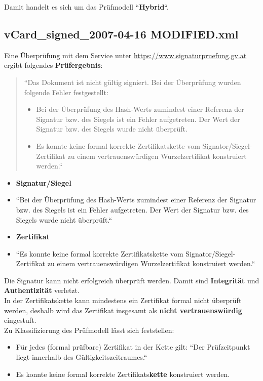 \noindent
Damit handelt es sich um das Prüfmodell ``\textbf{Hybrid}``.

\subsection*{vCard\_signed\_2007-04-16 MODIFIED.xml}

Eine Überprüfung mit dem Service unter \url{https://www.signaturpruefung.gv.at} ergibt folgendes \textbf{Prüfergebnis}:

\blockquote[]{
    ``Das Dokument ist nicht gültig signiert. Bei der Überprüfung wurden folgende Fehler festgestellt:
    \begin{itemize}
        \item  Bei der Überprüfung des Hash-Werts zumindest einer Referenz der Signatur bzw. des Siegels ist ein Fehler aufgetreten. Der Wert der Signatur bzw. des Siegels wurde nicht überprüft.
        \item  Es konnte keine formal korrekte Zertifikatskette vom Signator/Siegel-Zertifikat zu einem vertrauenswürdigen Wurzelzertifikat konstruiert werden.``
    \end{itemize}
}

\begin{itemize}
    \itemsep0.5em
    \item \textbf{Signatur/Siegel}
    \item[] ``Bei der Überprüfung des Hash-Werts zumindest einer Referenz der Signatur bzw. des Siegels ist ein Fehler aufgetreten. Der Wert der Signatur bzw. des Siegels wurde nicht überprüft.``
    \item \textbf{Zertifikat}
    \item[] ``Es konnte keine formal korrekte Zertifikatskette vom Signator/Siegel-Zertifikat zu einem vertrauenswürdigen Wurzelzertifikat konstruiert werden.``
\end{itemize}

\noindent
Die Signatur kann nicht erfolgreich überprüft werden.
Damit sind \textbf{Integrität} und \textbf{Authentizität} verletzt.\\

\noindent
In der Zertifikatskette kann mindestens ein Zertifikat formal nicht überprüft werden, deshalb wird das Zertifikat insgesamt als \textbf{nicht vertrauenswürdig} eingestuft.\\

\noindent
Zu Klassifizierung des Prüfmodell lässt sich feststellen:

\begin{itemize}
    \itemsep0.5em
    \item Für jedes (formal prüfbare) Zertifikat in der Kette gilt: ``Der Prüfzeitpunkt liegt innerhalb des Gültigkeitszeitraumes.``
    \item Es konnte keine formal korrekte Zertifikats\textbf{kette} konstruiert werden.
\end{itemize}

